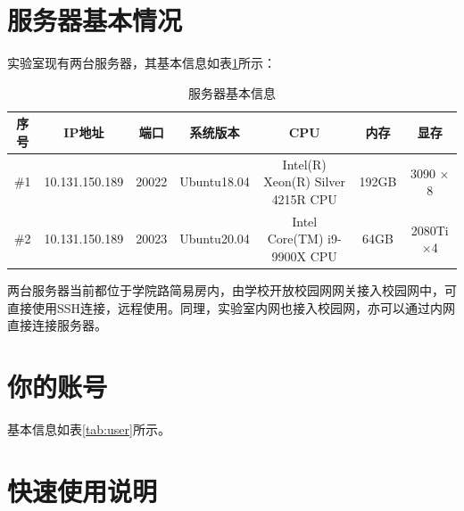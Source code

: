 \documentclass{article}
\begin{document}
\thispagestyle{fancy}
\section{服务器基本情况}
实验室现有两台服务器，其基本信息如表\ref{tab:server}所示：
\begin{table}[H]
  \centering
  \caption{服务器基本信息}
    \begin{tabular}{ccccccc}
      \toprule
       序号&IP地址& 端口 & 系统版本 & CPU & 内存& 显存 \\
      \hline
      \#1& 10.131.150.189& 20022& Ubuntu18.04&  Intel(R) Xeon(R) Silver 4215R CPU& 192GB& 3090 $\times$8 \\
      \#2&10.131.150.189 &20023&Ubuntu20.04& Intel Core(TM) i9-9900X CPU & 64GB & 2080Ti $\times$4\\
       \bottomrule
  \end{tabular}
  \label{tab:server}
\end{table}
两台服务器当前都位于学院路简易房内，由学校开放校园网网关接入校园网中，可直接使用SSH连接，远程使用。同理，实验室内网也接入校园网，亦可以通过内网直接连接服务器。
\section{你的账号}
基本信息如表\ref{tab:user}所示。
\begin{table}[H]
  \centering
  \caption{账号信息}
  \label{tab:user}
\end{table}
\section{快速使用说明}
\end{document}
